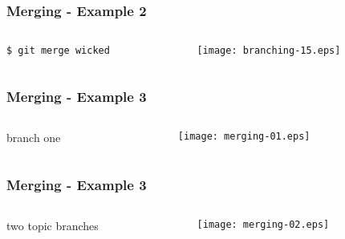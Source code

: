 \documentclass[english]{beamer}
\newcommand{\CMD}[1]{%
\texttt{\textcolor{code-blue}{#1}}%
}
\begin{document}
\begin{frame}
\frametitle{Merging - Example 2}

\begin{columns}[t]
        \begin{column}[T]{.5\textwidth}
                {\small
                \CMD{\$ git merge wicked} \\
                }
        \end{column}
        \begin{column}[T]{.5\textwidth}
                \texttt{[image: branching-15.eps]}
        \end{column}
\end{columns}
\end{frame}

\begin{frame}
\frametitle{Merging - Example 3}

\begin{columns}[t]
        \begin{column}[T]{.5\textwidth}
                branch one
        \end{column}
        \begin{column}[T]{.5\textwidth}
                \texttt{[image: merging-01.eps]}
        \end{column}
\end{columns}
\end{frame}

\begin{frame}
\frametitle{Merging - Example 3}

\begin{columns}[t]
        \begin{column}[T]{.5\textwidth}
                two topic branches
        \end{column}
        \begin{column}[T]{.5\textwidth}
                \texttt{[image: merging-02.eps]}
        \end{column}
\end{columns}
\end{frame}
\end{document}
